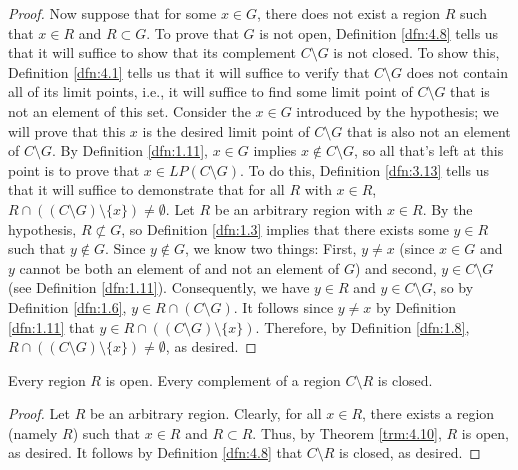 \documentclass[../main.tex]{subfiles}
\begin{document}
\begin{theorem}
\begin{proof}
        Now suppose that for some $x\in G$, there does not exist a region $R$ such that $x\in R$ and $R\subset G$. To prove that $G$ is not open, Definition \ref{dfn:4.8} tells us that it will suffice to show that its complement $C\setminus G$ is not closed. To show this, Definition \ref{dfn:4.1} tells us that it will suffice to verify that $C\setminus G$ does not contain all of its limit points, i.e., it will suffice to find some limit point of $C\setminus G$ that is not an element of this set. Consider the $x\in G$ introduced by the hypothesis; we will prove that this $x$ is the desired limit point of $C\setminus G$ that is also not an element of $C\setminus G$. By Definition \ref{dfn:1.11}, $x\in G$ implies $x\notin C\setminus G$, so all that's left at this point is to prove that $x\in LP(C\setminus G)$. To do this, Definition \ref{dfn:3.13} tells us that it will suffice to demonstrate that for all $R$ with $x\in R$, $R\cap((C\setminus G)\setminus\{x\})\neq\emptyset$. Let $R$ be an arbitrary region with $x\in R$. By the hypothesis, $R\not\subset G$, so Definition \ref{dfn:1.3} implies that there exists some $y\in R$ such that $y\notin G$. Since $y\notin G$, we know two things: First, $y\neq x$ (since $x\in G$ and $y$ cannot be both an element of and not an element of $G$) and second, $y\in C\setminus G$ (see Definition \ref{dfn:1.11}). Consequently, we have $y\in R$ and $y\in C\setminus G$, so by Definition \ref{dfn:1.6}, $y\in R\cap(C\setminus G)$. It follows since $y\neq x$ by Definition \ref{dfn:1.11} that $y\in R\cap((C\setminus G)\setminus\{x\})$. Therefore, by Definition \ref{dfn:1.8}, $R\cap((C\setminus G)\setminus\{x\})\neq\emptyset$, as desired.
    \end{proof}
\end{theorem}

\begin{corollary}\label{cly:4.11}
    Every region $R$ is open. Every complement of a region $C\setminus R$ is closed.
    \begin{proof}
        Let $R$ be an arbitrary region. Clearly, for all $x\in R$, there exists a region (namely $R$) such that $x\in R$ and $R\subset R$. Thus, by Theorem \ref{trm:4.10}, $R$ is open, as desired. It follows by Definition \ref{dfn:4.8} that $C\setminus R$ is closed, as desired.
    \end{proof}
\end{corollary}
\end{document}
